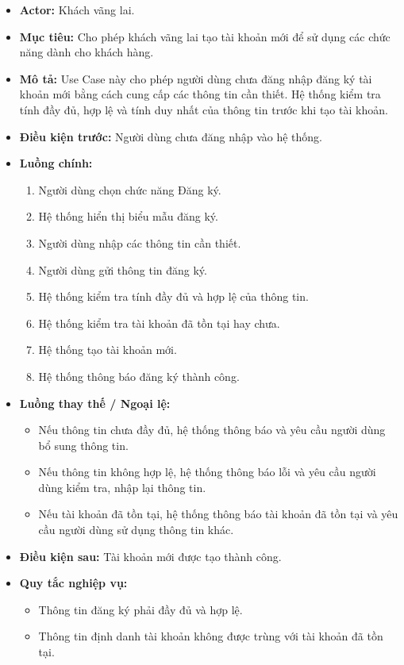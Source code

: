 \documentclass[12pt,a4paper]{article}
\begin{document}
\begin{itemize}
    \item \textbf{Actor:} Khách vãng lai.
    \item \textbf{Mục tiêu:} Cho phép khách vãng lai tạo tài khoản mới để sử dụng các chức năng dành cho khách hàng.
    \item \textbf{Mô tả:} Use Case này cho phép người dùng chưa đăng nhập đăng ký tài khoản mới bằng cách cung cấp các thông tin cần thiết. Hệ thống kiểm tra tính đầy đủ, hợp lệ và tính duy nhất của thông tin trước khi tạo tài khoản.
    \item \textbf{Điều kiện trước:} Người dùng chưa đăng nhập vào hệ thống.
    \item \textbf{Luồng chính:}
    \begin{enumerate}
        \item Người dùng chọn chức năng Đăng ký.
        \item Hệ thống hiển thị biểu mẫu đăng ký.
        \item Người dùng nhập các thông tin cần thiết.
        \item Người dùng gửi thông tin đăng ký.
        \item Hệ thống kiểm tra tính đầy đủ và hợp lệ của thông tin.
        \item Hệ thống kiểm tra tài khoản đã tồn tại hay chưa.
        \item Hệ thống tạo tài khoản mới.
        \item Hệ thống thông báo đăng ký thành công.
    \end{enumerate}
    \item \textbf{Luồng thay thế / Ngoại lệ:}
    \begin{itemize}
        \item Nếu thông tin chưa đầy đủ, hệ thống thông báo và yêu cầu người dùng bổ sung thông tin.
        \item Nếu thông tin không hợp lệ, hệ thống thông báo lỗi và yêu cầu người dùng kiểm tra, nhập lại thông tin.
        \item Nếu tài khoản đã tồn tại, hệ thống thông báo tài khoản đã tồn tại và yêu cầu người dùng sử dụng thông tin khác.
    \end{itemize}
    \item \textbf{Điều kiện sau:} Tài khoản mới được tạo thành công.
    \item \textbf{Quy tắc nghiệp vụ:}
    \begin{itemize}
        \item Thông tin đăng ký phải đầy đủ và hợp lệ.
        \item Thông tin định danh tài khoản không được trùng với tài khoản đã tồn tại.
    \end{itemize}
\end{itemize}
\end{document}
